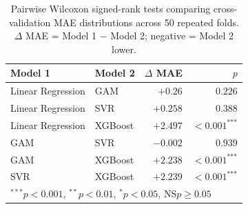 \begin{table}
    \caption{Pairwise Wilcoxon signed-rank tests comparing cross-validation
             MAE distributions across 50 repeated folds.
             $\Delta$ MAE = Model 1 $-$ Model 2; negative = Model 2 lower.}
    \label{tab:model_comparison_stats}
    \centering
    \small
    \begin{tabular}{llrr}
        \toprule
        Model 1 & Model 2 & $\Delta$ MAE & $p$ \\
        \midrule
        Linear Regression & GAM & $+0.26$ & $0.226$ \\
        Linear Regression & SVR & $+0.258$ & $0.388$ \\
        Linear Regression & XGBoost & $+2.497$ & $<0.001^{\text{***}}$ \\
        GAM & SVR & $-0.002$ & $0.939$ \\
        GAM & XGBoost & $+2.238$ & $<0.001^{\text{***}}$ \\
        SVR & XGBoost & $+2.239$ & $<0.001^{\text{***}}$ \\
        \bottomrule
        \multicolumn{4}{l}{\footnotesize $^{***}p<0.001$,\; $^{**}p<0.01$,\; $^{*}p<0.05$,\; NS\;$p\geq0.05$}
    \end{tabular}
\end{table}
